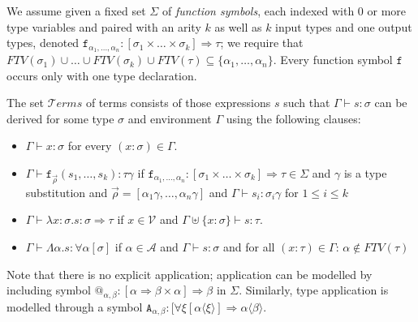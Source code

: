 \documentclass[runningheads,a4paper]{llncs}
\newcommand{\Typevars}{\mathcal{A}}
\newcommand{\Vars}{\mathcal{V}}
\newcommand{\Terms}{\mathcal{T}\!\mathit{erms}}
\newcommand{\quant}[2]{\forall #1[#2]}
\newcommand{\arrtype}{\Rightarrow}
\newcommand{\abs}[2]{\lambda #1.#2}
\newcommand{\tabs}[2]{\Lambda #1.#2}
\newcommand{\tapp}[2]{#1 * #2}
\newcommand{\subst}[2]{#1:=#2}
\newcommand{\meta}[2]{#1\langle#2\rangle}
\newcommand{\FTV}{\mathit{FTV}}
\begin{document}
\begin{definition}
We assume given a fixed set $\Sigma$ of \emph{function symbols}, each
indexed with $0$ or more type variables and paired with an arity $k$
as well as $k$ input types and one output types, denoted
$\mathtt{f}_{\alpha_1,\dots,\alpha_n} : [\sigma_1 \times \dots \times
\sigma_k] \arrtype \tau$; we require that $\FTV(\sigma_1) \cup \dots
\cup \FTV(\sigma_k) \cup \FTV(\tau) \subseteq \{ \alpha_1,\dots,
\alpha_n\}$.
Every function symbol $\mathtt{f}$ occurs only with one type
declaration.

The set $\Terms$ of terms consists of those expressions $s$ such that
$\Gamma \vdash s : \sigma$ can be derived for some type $\sigma$ and
environment $\Gamma$ using the following clauses:
\begin{itemize}
\item $\Gamma \vdash x : \sigma$ for every $(x : \sigma) \in \Gamma$.
\item $\Gamma \vdash \mathtt{f}_{\vec{\rho}}(s_1,\dots,s_k) :
  \tau\gamma$ if $\mathtt{f}_{\alpha_1,\dots,\alpha_n} : [\sigma_1
  \times \dots \times \sigma_k] \arrtype \tau \in \Sigma$ and
  $\gamma$ is a type substitution and $\vec{\rho} =
  [\alpha_1\gamma,\dots,\alpha_n\gamma]$ and $\Gamma \vdash s_i :
  \sigma_i\gamma$ for $1 \leq i \leq k$
\item $\Gamma \vdash \abs{x:\sigma}{s} : \sigma \arrtype \tau$ if $x
  \in \Vars$ and $\Gamma \uplus \{ x : \sigma \} \vdash s : \tau$.
\item $\Gamma \vdash \tabs{\alpha}{s} : \quant{\alpha}{\sigma}$ if
  $\alpha \in \Typevars$ and $\Gamma \vdash s : \sigma$ and for all
  $(x : \tau) \in \Gamma$: $\alpha \notin \FTV(\tau)$
\end{itemize}
\end{definition}

Note that there is no explicit application; application can be modelled
by including symbol $@_{\alpha,\beta} : [\alpha \arrtype \beta \times
\alpha] \arrtype \beta$ in $\Sigma$.
Similarly, type application is modelled through a symbol
$\mathtt{A}_{\alpha,\beta} : [\quant{\xi}{\meta{\alpha}{\xi}} \arrtype
\meta{\alpha}{\beta}$.
\end{document}

